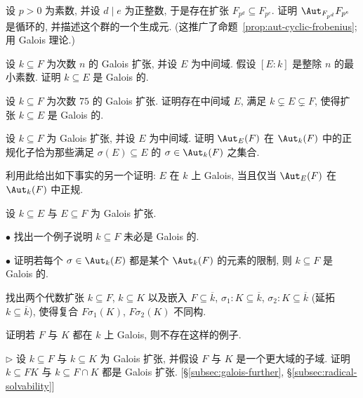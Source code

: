 \begin{prob}\label{ex:finite-field-galois-degree}
设 $p>0$ 为素数, 并设 $d\mid e$ 为正整数, 于是存在扩张 $F_{p^d}\subseteq F_{p^e}$. 证明 $\Aut_{F_{p^d}}F_{p^e}$ 是循环的, 并描述这个群的一个生成元. (这推广了命题~\ref{prop:aut-cyclic-frobenius}; 用 Galois 理论.)
\end{prob}

\begin{prob}\label{ex:prime-degree-galois}
设 $k\subseteq F$ 为次数 $n$ 的 Galois 扩张, 并设 $E$ 为中间域. 假设 $[E:k]$ 是整除 $n$ 的最小素数. 证明 $k\subseteq E$ 是 Galois 的.
\end{prob}

\begin{prob}\label{ex:degree75-galois}
设 $k\subseteq F$ 为次数 $75$ 的 Galois 扩张. 证明存在中间域 $E$, 满足 $k\subsetneq E\subsetneq F$, 使得扩张 $k\subseteq E$ 是 Galois 的.
\end{prob}

\begin{prob}\label{ex:normalizer-autE}
设 $k\subseteq F$ 为 Galois 扩张, 并设 $E$ 为中间域. 证明 $\Aut_E(F)$ 在 $\Aut_k(F)$ 中的正规化子恰为那些满足 $\sigma(E)\subseteq E$ 的 $\sigma\in\Aut_k(F)$ 之集合.

利用此给出如下事实的另一个证明: $E$ 在 $k$ 上 Galois, 当且仅当 $\Aut_E(F)$ 在 $\Aut_k(F)$ 中正规.
\end{prob}

\begin{prob}\label{ex:galois-transitive}
设 $k\subseteq E$ 与 $E\subseteq F$ 为 Galois 扩张.

$\bullet$ 找出一个例子说明 $k\subseteq F$ 未必是 Galois 的.

$\bullet$ 证明若每个 $\sigma\in\Aut_k(E)$ 都是某个 $\Aut_k(F)$ 的元素的限制, 则 $k\subseteq F$ 是 Galois 的.
\end{prob}

\begin{prob}\label{ex:composite-nonisomorphic}
找出两个代数扩张 $k\subseteq F$, $k\subseteq K$ 以及嵌入 $F\subseteq\overline{k}$, $\sigma_1:K\subseteq\overline{k}$, $\sigma_2:K\subseteq\overline{k}$ (延拓 $k\subseteq\overline{k}$), 使得复合 $F\sigma_1(K)$, $F\sigma_2(K)$ 不同构.

证明若 $F$ 与 $K$ 都在 $k$ 上 Galois, 则不存在这样的例子.
\end{prob}

\begin{prob}\label{ex:composite-intersection-galois}
$\triangleright$ 设 $k\subseteq F$ 与 $k\subseteq K$ 为 Galois 扩张, 并假设 $F$ 与 $K$ 是一个更大域的子域. 证明 $k\subseteq FK$ 与 $k\subseteq F\cap K$ 都是 Galois 扩张. [§\ref{subsec:galois-further}, §\ref{subsec:radical-solvability}]
\end{prob}

